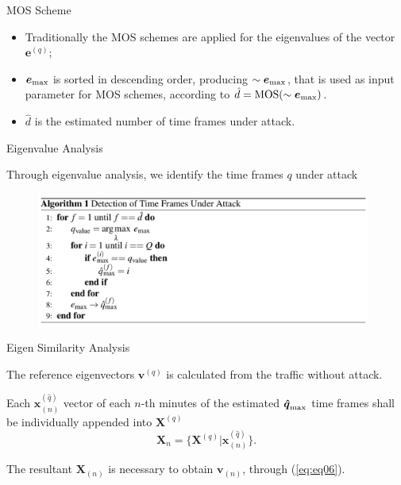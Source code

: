 \documentclass[newPxFont, numfooter, sectionpages]{beamer}
\begin{document}
\begin{frame}{MOS Scheme}

	\begin{itemize}
		\item Traditionally the MOS schemes are applied for the eigenvalues of the vector $\boldsymbol{e}^{(q)}$;
		\item $\boldsymbol{e}_{\rm max}$ is sorted in descending order, producing $\sim\boldsymbol{e}_{\rm max}$, that is used as input parameter for MOS schemes, according to $\hat{d} = \rm{MOS}(\sim\boldsymbol{e}_{\rm max})$.
		\item $\hat{d}$ is the estimated number of time frames under attack.
	\end{itemize}
	
\end{frame}
\begin{frame}{Eigenvalue Analysis}
	
	Through eigenvalue analysis, we identify the time frames $q$ under attack

	\begin{figure}[h!]
	     \centering 
	     \includegraphics[width=11cm]{alg.png}
	     \label{fig:2_fig9}
	\end{figure}

\end{frame}
\begin{frame}{Eigen Similarity Analysis}
	
	The reference eigenvectors $\boldsymbol{v}^{(q)}$ is calculated from the traffic without attack. 

	Each $\boldsymbol{x}^{(\hat{q})}_{(n)}$ vector of each $n$-th minutes of the estimated $\rm{\boldsymbol{\hat{q}}}_{\rm max}$ time frames shall be individually appended into $\boldsymbol{X}^{(q)}$
	\begin{equation}\label{eq:eq12}
		\boldsymbol{X}_{n} = \{\boldsymbol{X}^{(q)} | \boldsymbol{x}^{(\hat{q})}_{(n)}\}.
	\end{equation}

	The resultant $\boldsymbol{X}_{(n)}$ is necessary to obtain $\boldsymbol{v}_{(n)}$, through (\ref{eq:eq06}).

\end{frame}
\end{document}

